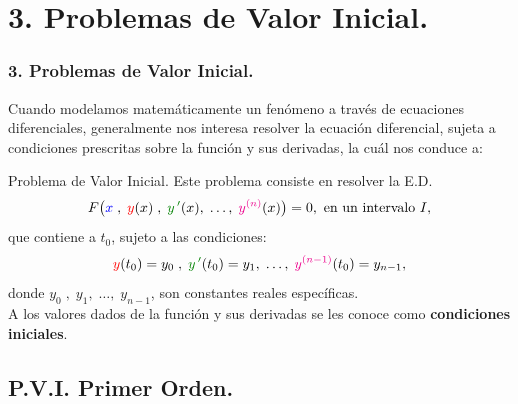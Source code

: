 \documentclass{beamer}
\begin{document}
\frame{\titlepage}

\section{3. Problemas de Valor Inicial.} %

\begin{frame}
	\frametitle{3. Problemas de Valor Inicial.}
	\vspace{-2mm} Cuando modelamos matemáticamente un fenómeno a través de ecuaciones diferenciales, generalmente nos interesa resolver la ecuación diferencial, sujeta a condiciones prescritas sobre la función y sus derivadas, la cuál nos conduce a:
	\begin{block}{Problema de Valor Inicial.}
		Este problema consiste en resolver la E.D. \vspace{-2mm}
		\[
			F \big(\color{blue} x \color{black} \;,\; \color{red} y \color{black} (x) \;,\; \color{green!50!black} y\,' \color{black}(x) , \;\ldots,\; \color{magenta} y^{(n)} \color{black}(x)\big) = 0,  \mbox{ en un intervalo } I,
		\]
		que contiene a \(t_0\), sujeto a las condiciones: \vspace{-2mm}
		\[
			\color{red} y \color{black} (t_0) = y_0 \;,\; \color{green!50!black} y\,' \color{black} (t_0) = y_1 , \;\ldots,\; \color{magenta} y^{(n-1)} \color{black} (t_0) = y_{n-1},
		\]
		donde \(y_0 \;,\; y_1, \;\ldots,\; y_{n-1}\), son constantes reales específicas. \\
		A los valores dados de la función y sus derivadas se les conoce como \textbf{condiciones iniciales}.
	\end{block}
\end{frame}

\subsection{P.V.I. Primer Orden.} %
\end{document}
